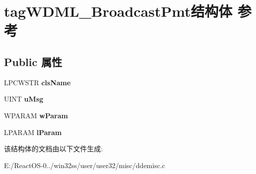 \hypertarget{structtag_w_d_m_l___broadcast_pmt}{}\section{tag\+W\+D\+M\+L\+\_\+\+Broadcast\+Pmt结构体 参考}
\label{structtag_w_d_m_l___broadcast_pmt}
\subsection*{Public 属性}
\begin{DoxyCompactItemize}
\item 
\mbox{\label{structtag_w_d_m_l___broadcast_pmt_ae41ba7976bcd3644c98ab07ed93f86ad}} 
L\+P\+C\+W\+S\+TR {\bfseries cls\+Name}
\item 
\mbox{\label{structtag_w_d_m_l___broadcast_pmt_a81bd26dd1ff4eaf84362b493d05e4d96}} 
U\+I\+NT {\bfseries u\+Msg}
\item 
\mbox{\label{structtag_w_d_m_l___broadcast_pmt_aebe424c7ea237efbbd6cccae1f8286ef}} 
W\+P\+A\+R\+AM {\bfseries w\+Param}
\item 
\mbox{\label{structtag_w_d_m_l___broadcast_pmt_a7978e11861f239d128c6dd994396b19e}} 
L\+P\+A\+R\+AM {\bfseries l\+Param}
\end{DoxyCompactItemize}


该结构体的文档由以下文件生成\+:\begin{DoxyCompactItemize}
\item 
E\+:/\+React\+O\+S-\/0../win32ss/user/user32/misc/ddemisc.\+c\end{DoxyCompactItemize}
